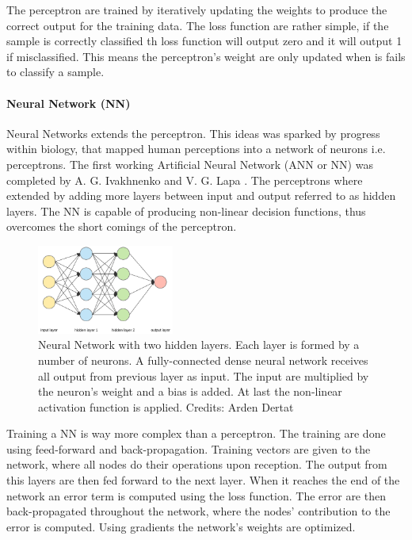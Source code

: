 The perceptron are trained by iteratively updating the weights to produce the correct output for the training data. The loss function are rather simple, if the sample is correctly classified th loss function will output zero and it will output 1 if misclassified. This means the perceptron's weight are only updated when is fails to classify a sample. 

\paragraph{Neural Network (NN)}

Neural Networks extends the perceptron. This ideas was sparked by progress within biology, that mapped human perceptions into a network of neurons i.e. perceptrons. The first working Artificial Neural Network (ANN or NN) was completed by A. G. Ivakhnenko and V. G. Lapa \cite{Alexey}. The perceptrons where extended by adding more layers between input and output referred to as hidden layers. The NN is capable of producing non-linear decision functions, thus overcomes the short comings of the perceptron.  

\begin{figure}[H]
    \centering
    \includegraphics[width=0.4\textwidth]{figures/nn.png}
    \caption[]{Neural Network with two hidden layers. Each layer is formed by a number of neurons. A fully-connected dense neural network receives all output from previous layer as input. The input are multiplied by the neuron's weight and a bias is added. At last the non-linear activation function is applied. Credits: Arden Dertat}
    \label{fig:nn}
\end{figure}

Training a NN is way more complex than a perceptron. The training are done using feed-forward and back-propagation. Training vectors are given to the network, where all nodes do their operations upon reception. The output from this layers are then fed forward to the next layer. When it reaches the end of the network an error term is computed using the loss function. The error are then back-propagated throughout the network, where the nodes' contribution to the error is computed. Using gradients the network's weights are optimized. 

